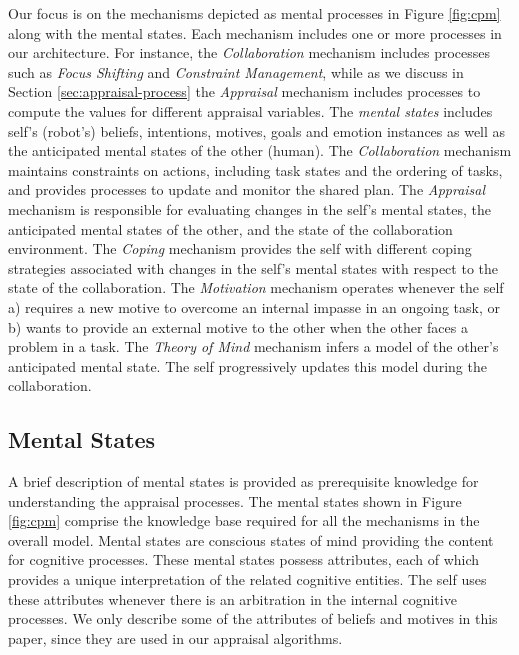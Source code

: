 \documentclass{article}
\begin{document}
Our focus is on the mechanisms depicted as mental processes in Figure
\ref{fig:cpm} along with the mental states. Each mechanism includes one or
more processes in our architecture. For instance, the \textit{Collaboration}
mechanism includes processes such as \textit{Focus Shifting} and
\textit{Constraint Management}, while as we discuss in Section
\ref{sec:appraisal-process} the \textit{Appraisal} mechanism includes processes
to compute the values for different appraisal variables. The \textit{mental
states} includes self's (robot's) beliefs, intentions, motives, goals and
emotion instances as well as the anticipated mental states of the other (human).
The \textit{Collaboration} mechanism maintains constraints on actions, including
task states and the ordering of tasks, and provides processes to update and
monitor the shared plan. The \textit{Appraisal} mechanism is responsible for
evaluating changes in the self's mental states, the anticipated mental states of
the other, and the state of the collaboration environment. The \textit{Coping}
mechanism provides the self with different coping strategies associated with
changes in the self's mental states with respect to the state of the
collaboration. The \textit{Motivation} mechanism operates whenever the self a)
requires a new motive to overcome an internal impasse in an ongoing task, or b)
wants to provide an external motive to the other when the other faces a problem
in a task. The \textit{Theory of Mind} mechanism infers a model of the other's
anticipated mental state. The self progressively updates this model during the
collaboration.

\vspace*{-2mm}
\subsection{Mental States}
\label{sec:mental-states}
\vspace*{-2mm}
A brief description of mental states is provided as prerequisite knowledge for
understanding the appraisal processes. The mental states shown in Figure
\ref{fig:cpm} comprise the knowledge base required for all the mechanisms in the
overall model. Mental states are conscious states of mind providing the content
for cognitive processes. These mental states possess attributes, each of which
provides a unique interpretation of the related cognitive entities. The self
uses these attributes whenever there is an arbitration in the internal cognitive
processes. We only describe some of the attributes of beliefs and motives in
this paper, since they are used in our appraisal algorithms.
\end{document}
